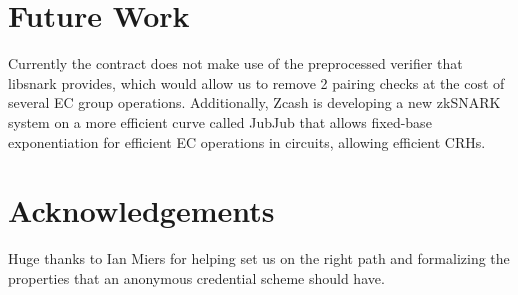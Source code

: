 \documentclass[11 pt]{extarticle}
\theoremstyle{remark}
\begin{document}
\section{Future Work}
Currently the contract does not make use of the preprocessed verifier that
libsnark provides, which would allow us to remove 2 pairing checks at the cost
of several EC group operations. Additionally, Zcash is developing a new zkSNARK
system on a more efficient curve called JubJub\cite{ZcashJubjub} that allows fixed-base
exponentiation for efficient EC operations in
circuits, allowing efficient CRHs.

\section{Acknowledgements}
Huge thanks to Ian Miers for helping set us on the right path and formalizing
the properties that an anonymous credential scheme should have.



\end{document}

